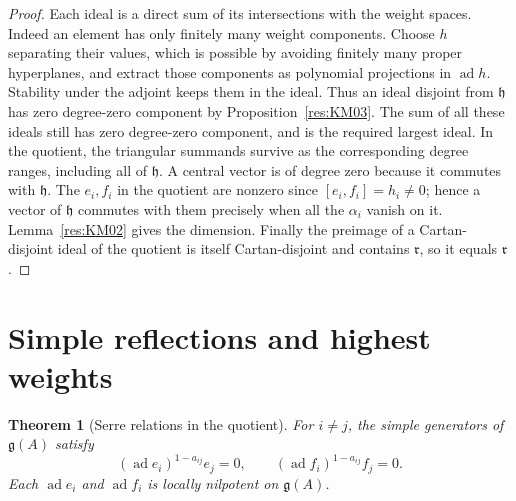 \documentclass[11pt,oneside,openany]{book}
\newtheorem{theorem}{Theorem}[chapter]
\theoremstyle{definition}
\theoremstyle{remark}
\begin{document}
\begin{proof}
Each ideal is a direct sum of its intersections with the weight
spaces. Indeed an element has only finitely many weight components.
Choose \(h\) separating their values, which is possible by avoiding
finitely many proper hyperplanes, and extract those components
as polynomial projections in \(\operatorname{ad}h\). Stability
under the adjoint keeps them in the ideal. Thus an ideal disjoint
from \(\mathfrak h\) has zero degree-zero component by
Proposition~\ref{res:KM03}. The sum of all these ideals still has
zero degree-zero component, and is the required largest ideal.
In the quotient, the triangular summands survive as the corresponding
degree ranges, including all of \(\mathfrak h\). A central vector is
of degree zero because it commutes with \(\mathfrak h\).
The \(e_i,f_i\) in the quotient are nonzero since
\([e_i,f_i]=h_i\ne0\); hence a vector of \(\mathfrak h\) commutes
with them precisely when all the \(\alpha_i\) vanish on it.
Lemma~\ref{res:KM02} gives the dimension. Finally the preimage of a
Cartan-disjoint ideal of the quotient is itself Cartan-disjoint and
contains \(\mathfrak r\), so it equals \(\mathfrak r\).
\end{proof}

\section{Simple reflections and highest weights}

\begin{theorem}[Serre relations in the quotient]
\label{res:KM05}
For \(i\ne j\), the simple generators of \(\mathfrak g(A)\) satisfy
\[
 (\operatorname{ad}e_i)^{1-a_{ij}} e_j=0,\qquad
 (\operatorname{ad}f_i)^{1-a_{ij}} f_j=0 .
\]
Each \(\operatorname{ad}e_i\) and \(\operatorname{ad}f_i\) is locally
nilpotent on \(\mathfrak g(A)\).
\end{theorem}
\end{document}

